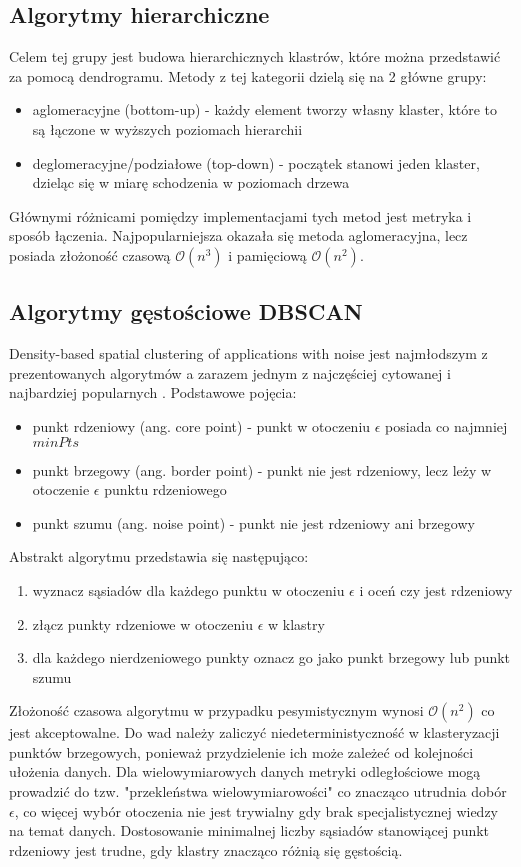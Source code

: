 \subsection{Algorytmy hierarchiczne}
Celem tej grupy jest budowa hierarchicznych klastrów, które można przedstawić za pomocą dendrogramu. Metody z tej kategorii dzielą się na 2 główne grupy:
\begin{itemize}
	\item aglomeracyjne (bottom-up) - każdy element tworzy własny klaster, które to są łączone w wyższych poziomach hierarchii
	\item deglomeracyjne/podziałowe (top-down) - początek stanowi jeden klaster, dzieląc się w miarę schodzenia w poziomach drzewa
\end{itemize}
Głównymi różnicami pomiędzy implementacjami tych metod jest metryka i sposób łączenia. Najpopularniejsza okazała się metoda aglomeracyjna, lecz posiada złożoność czasową $\mathcal{O}(n^3)$ i pamięciową $\mathcal{O}(n^2)$.

\subsection{Algorytmy gęstościowe DBSCAN}
Density-based spatial clustering of applications with noise jest najmłodszym z prezentowanych algorytmów a zarazem jednym z najczęściej cytowanej i najbardziej popularnych \cite{Est96}.
Podstawowe pojęcia:
\begin{itemize}
	\item punkt rdzeniowy (ang. core point) - punkt w otoczeniu $\epsilon$ posiada co najmniej $minPts$
	\item punkt brzegowy (ang. border point) - punkt nie jest rdzeniowy, lecz leży w otoczenie $\epsilon$ punktu rdzeniowego
	\item punkt szumu (ang. noise point) - punkt nie jest rdzeniowy ani brzegowy
\end{itemize}
Abstrakt algorytmu przedstawia się następująco: \cite{Sch17}
\begin{enumerate}
	\item wyznacz sąsiadów dla każdego punktu w otoczeniu $\epsilon$ i oceń czy jest rdzeniowy
	\item złącz punkty rdzeniowe w otoczeniu $\epsilon$ w klastry
	\item dla każdego nierdzeniowego punkty oznacz go jako punkt brzegowy lub punkt szumu
\end{enumerate}
Złożoność czasowa algorytmu w przypadku pesymistycznym wynosi $\mathcal{O}(n^2)$ co jest akceptowalne. Do wad należy zaliczyć niedeterministyczność w klasteryzacji punktów brzegowych, ponieważ przydzielenie ich może zależeć od kolejności ułożenia danych. Dla wielowymiarowych danych metryki odległościowe mogą prowadzić do tzw. "przekleństwa wielowymiarowości" co znacząco utrudnia dobór $\epsilon$, co więcej wybór otoczenia nie jest trywialny gdy brak specjalistycznej wiedzy na temat danych. Dostosowanie minimalnej liczby sąsiadów stanowiącej punkt rdzeniowy jest trudne, gdy klastry znacząco różnią się gęstością.

